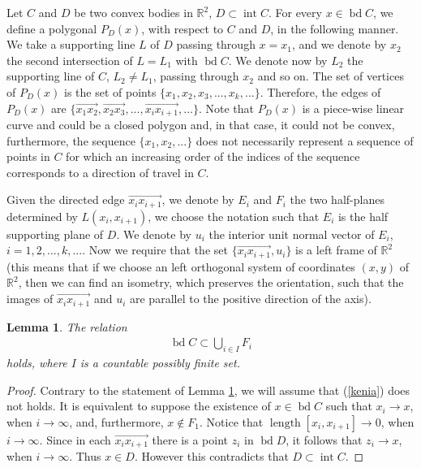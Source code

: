 \documentclass[12pt]{amsart}
\newcommand{\inte}{\operatorname*{int}}
\newcommand{\bd}{\operatorname*{bd}}
\newcommand{\len}{\operatorname*{length}}
\newtheorem{lemma}{Lemma}
\begin{document}
Let $C$ and $D$ be two convex bodies in $\mathbb{R}^2$, $D \subset \inte C$. For every $x\in \bd C$, we define a polygonal $P_D(x)$, with respect to $C$ and $D$, in the following manner. We take a  supporting line  $L$ of $D$ passing through $x=x_1$, and we denote by $x_2$ the second intersection of $L=L_1$ with $\bd C$.  
We denote now by $L_2$ the supporting line of $C$, $L_2\not= L_1$, passing through $x_2$ and so on. The set of vertices of $P_D(x)$ is the set of points $\{x_1,x_2,x_3,...,x_k,...\}$. Therefore, the edges of $P_{D}(x)$ are  
$\{ \overrightarrow{x_1x_{2}},\overrightarrow{x_2x_{3}},...,\overrightarrow{x_ix_{i+1}},...\}$. Note that $P_D(x)$ is a piece-wise linear curve and could be a closed polygon and, in that case, it could not be convex, furthermore, the sequence $\{x_1,x_2,...\}$ does not necessarily represent a sequence of points in $C$ for which an increasing order of the indices of the sequence corresponds to a direction of travel in $C$.

Given the directed edge $\overrightarrow{x_ix_{i+1}}$, we denote by $E_{i}$ and $F_{i}$ the two half-planes determined by  $L(x_i,x_{i+1})$, we choose the notation such that $E_{i}$ is the half supporting plane of $D$. We denote by $u_i$ the interior unit normal vector of $E_{i}$, $i=1,2,...,k,...$. Now we require that the set $\{\overrightarrow{x_ix_{i+1}}, u_i\}$ is a  left frame of $\mathbb{R}^2$ (this means that if we choose an left orthogonal system of coordinates $(x,y)$ of $\mathbb{R}^2$, then we can find an isometry, which preserves the orientation, such that the images of $\overrightarrow{x_ix_{i+1}}$ and  $u_i$ are parallel to the positive direction of the axis).
\begin{lemma}\label{lizbeth}The relation
\begin{eqnarray}\label{kenia}
\bd C\subset \bigcup_{i\in I} F_{i}
\end{eqnarray}
holds, where $I$ is a countable possibly finite set.
\end{lemma} 
\begin{proof}
Contrary to the statement of Lemma \ref{lizbeth}, we will assume that (\ref{kenia}) does not holds. It is equivalent to suppose the existence of $x\in \bd C$ such that $x_i \rightarrow x$, when $i\rightarrow \infty$, and, furthermore, $x\notin F_{1}$. Notice that $\len [x_i,x_{i+1}]\rightarrow 0$, when $i\rightarrow \infty$. Since in each 
$\overrightarrow{x_ix_{i+1}}$ there is a point $z_i$ in $\bd D$, it follows that $z_i\rightarrow x$, when $i\rightarrow \infty$. Thus $x\in D$. However this contradicts that $D\subset \inte C$.
\end{proof}
\end{document}
